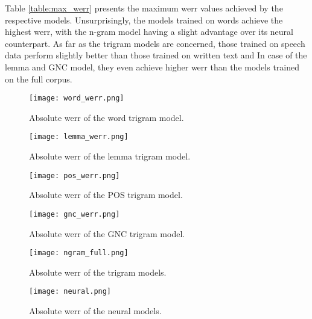  Table \ref{table:max_werr} presents the maximum \gls{werr} values achieved by the respective models. Unsurprisingly, the models trained on words achieve the highest \gls{werr}, with the n-gram model having a slight advantage over its neural counterpart. As far as the trigram models are concerned, those trained on speech data perform slightly better than those trained on written text and In case of the lemma and GNC model, they even achieve higher \gls{werr} than the models trained on the full corpus.

\begin{figure}[!htbp]
	  \centering
	  \texttt{[image: word\_werr.png]}
	  \caption[Absolute WERR of the word trigram model]{Absolute \gls{werr} of the word trigram model.}
	      \label{figure:word}
\end{figure}

\begin{figure}[!htbp]
	  \centering
	  \texttt{[image: lemma\_werr.png]}
	  \caption[Absolute WERR of the lemma trigram model]{Absolute \gls{werr} of the lemma trigram model.}
	      \label{figure:lemma}
\end{figure}

\begin{figure}[!htbp]
	  \centering
	  \texttt{[image: pos\_werr.png]}
	  \caption[Absolute WERR of the POS trigram model]{Absolute \gls{werr} of the POS trigram model.}
	      \label{figure:pos}
\end{figure}

\begin{figure}[!htbp]
	  \centering
	  \texttt{[image: gnc\_werr.png]}
	  \caption[Absolute WERR of the GNC trigram model]{Absolute \gls{werr} of the GNC trigram model.}
	      \label{figure:gnc}
\end{figure}

\begin{figure}[!htbp]
	  \centering
	  \texttt{[image: ngram\_full.png]}
	  \caption[Absolute WERR of the trigram models]{Absolute \gls{werr} of the trigram models.}
	      \label{figure:neural}
\end{figure}

\begin{figure}[!htbp]
	  \centering
	  \texttt{[image: neural.png]}
	  \caption[Absolute WERR of the neural models]{Absolute \gls{werr} of the neural models.}
	      \label{figure:neural}
\end{figure}

